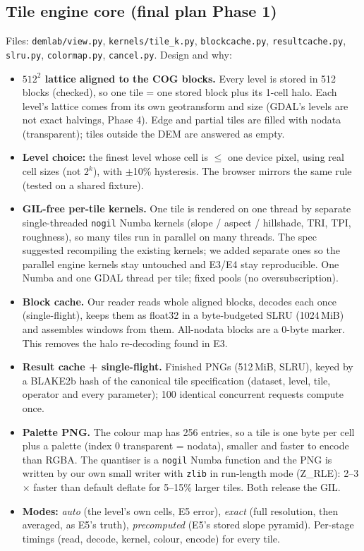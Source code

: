 ﻿\documentclass[11pt,a4paper]{article}
\newcommand{\code}[1]{\texttt{#1}}
\begin{document}
\subsection{Tile engine core (final plan Phase 1)}\label{sec:p5engine}
Files: \code{demlab/view.py}, \code{kernels/tile\_k.py}, \code{blockcache.py}, \code{resultcache.py}, \code{slru.py},
\code{colormap.py}, \code{cancel.py}. Design and why:
\begin{itemize}
  \item \textbf{$512^2$ lattice aligned to the COG blocks.} Every level is stored in 512 blocks (checked), so one tile =
  one stored block plus its 1-cell halo. Each level's lattice comes from its own geotransform and size (GDAL's levels
  are not exact halvings, Phase 4). Edge and partial tiles are filled with nodata (transparent); tiles outside the
  DEM are answered as empty.
  \item \textbf{Level choice:} the finest level whose cell is $\leq$ one device pixel, using real cell sizes (not
  $2^k$), with $\pm$10\% hysteresis. The browser mirrors the same rule (tested on a shared fixture).
  \item \textbf{GIL-free per-tile kernels.} One tile is rendered on one thread by separate single-threaded
  \code{nogil} Numba kernels (slope / aspect / hillshade, TRI, TPI, roughness), so many tiles run in parallel on many
  threads. The spec suggested recompiling the existing kernels; we added separate ones so the parallel engine kernels
  stay untouched and E3/E4 stay reproducible. One Numba and one GDAL thread per tile; fixed pools (no oversubscription).
  \item \textbf{Block cache.} Our reader reads whole aligned blocks, decodes each once (single-flight), keeps them as
  float32 in a byte-budgeted SLRU (1024\,MiB) and assembles windows from them. All-nodata blocks are a 0-byte marker.
  This removes the halo re-decoding found in E3.
  \item \textbf{Result cache + single-flight.} Finished PNGs (512\,MiB, SLRU), keyed by a BLAKE2b hash of the canonical
  tile specification (dataset, level, tile, operator and every parameter); 100 identical concurrent requests
  compute once.
  \item \textbf{Palette PNG.} The colour map has 256 entries, so a tile is one byte per cell plus a palette (index 0
  transparent = nodata), smaller and faster to encode than RGBA. The quantiser is a \code{nogil} Numba function and
  the PNG is written by our own small writer with \code{zlib} in run-length mode (Z\_RLE): 2--3$\times$ faster than
  default deflate for 5--15\% larger tiles. Both release the GIL.
  \item \textbf{Modes:} \emph{auto} (the level's own cells, E5 error), \emph{exact} (full resolution, then averaged, as
  E5's truth), \emph{precomputed} (E5's stored slope pyramid). Per-stage timings (read, decode, kernel, colour,
  encode) for every tile.
\end{itemize}
\end{document}
